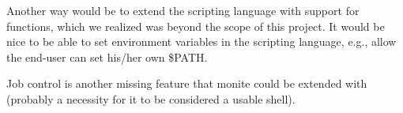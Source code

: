 \documentclass[11pt,a4paper]{article}
\begin{document}
Another way would be to extend the scripting language with support for
functions, which we realized was beyond the scope of this project. It would be
nice to be able to set environment variables in the scripting language, e.g.,
allow the end-user can set his/her own \$PATH.

Job control is another missing feature that monite could be extended with
(probably a necessity for it to be considered a usable shell).
\end{document}
